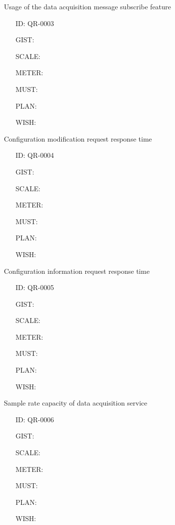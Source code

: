         Usage of the data acquisition message subscribe feature

        \begin{itemize}
          \setlength{\itemindent}{.5in}
          \itemsep .15em
          \item[ID:] QR-0003
          \item[GIST:]
          \item[SCALE:]
          \item[METER:]
          \item[MUST:]
          \item[PLAN:]
          \item[WISH:]
        \end{itemize}

        Configuration modification request response time

        \begin{itemize}
          \setlength{\itemindent}{.5in}
          \itemsep .15em
          \item[ID:] QR-0004
          \item[GIST:]
          \item[SCALE:]
          \item[METER:]
          \item[MUST:]
          \item[PLAN:]
          \item[WISH:]
        \end{itemize}

        Configuration information request response time

        \begin{itemize}
          \setlength{\itemindent}{.5in}
          \itemsep .15em
          \item[ID:] QR-0005
          \item[GIST:]
          \item[SCALE:]
          \item[METER:]
          \item[MUST:]
          \item[PLAN:]
          \item[WISH:]
        \end{itemize}

        Sample rate capacity of data acquisition service

        \begin{itemize}
          \setlength{\itemindent}{.5in}
          \itemsep .15em
          \item[ID:] QR-0006
          \item[GIST:]
          \item[SCALE:]
          \item[METER:]
          \item[MUST:]
          \item[PLAN:]
          \item[WISH:]
        \end{itemize}

